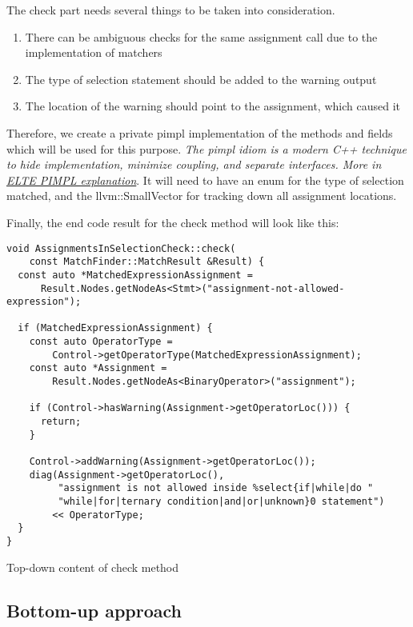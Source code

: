 The check part needs several things to be taken into consideration. 

\begin{enumerate}
    \item There can be ambiguous checks for the same assignment call due to the implementation of matchers
    \item The type of selection statement should be added to the warning output
    \item The location of the warning should point to the assignment, which caused it
\end{enumerate}

Therefore, we create a private pimpl implementation of the methods and fields which will be used for this purpose. \textit{The pimpl idiom is a modern C++ technique to hide implementation, minimize coupling, and separate interfaces. More in \href{http://aszt.inf.elte.hu/~gsd/halado_cpp/ch09s03.html}{ELTE PIMPL explanation}}. It will need to have an enum for the type of selection matched, and the llvm::SmallVector for tracking down all assignment locations.     

Finally, the end code result for the check method will look like this:

\begin{listing}[H]
\begin{verbatim}
void AssignmentsInSelectionCheck::check(
    const MatchFinder::MatchResult &Result) {
  const auto *MatchedExpressionAssignment =
      Result.Nodes.getNodeAs<Stmt>("assignment-not-allowed-expression");

  if (MatchedExpressionAssignment) {
    const auto OperatorType =
        Control->getOperatorType(MatchedExpressionAssignment);
    const auto *Assignment =
        Result.Nodes.getNodeAs<BinaryOperator>("assignment");

    if (Control->hasWarning(Assignment->getOperatorLoc())) {
      return;
    }

    Control->addWarning(Assignment->getOperatorLoc());
    diag(Assignment->getOperatorLoc(),
         "assignment is not allowed inside %select{if|while|do "
         "while|for|ternary condition|and|or|unknown}0 statement")
        << OperatorType;
  }
}
\end{verbatim}
\caption{Top-down content of check method }
\end{listing}


\subsection{Bottom-up approach}
